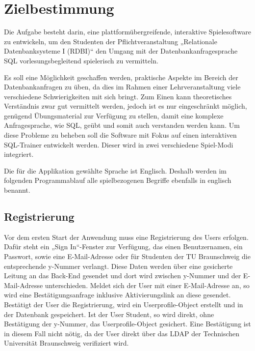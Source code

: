 
\chapter{Zielbestimmung}\label{chap:zielbestimmung}

Die Aufgabe besteht darin, eine plattform\"ubergreifende, interaktive Spielesoftware zu entwickeln, um den
Studenten der Pflichtveranstaltung „Relationale Datenbanksysteme I (RDBI)“ den Umgang mit
der Datenbankanfragesprache SQL vorlesungsbegleitend spielerisch zu vermitteln.

Es soll eine M\"oglichkeit geschaffen werden, praktische Aspekte im Bereich der Datenbankanfragen zu \"uben, da dies im Rahmen 
einer Lehrveranstaltung viele verschiedene Schwierigkeiten mit sich bringt. Zum Einen kann theoretisches Verst\"andnis zwar gut vermittelt werden, 
jedoch ist es nur eingeschr\"ankt m\"oglich, gen\"ugend \"Ubungsmaterial zur Verf\"ugung zu stellen, damit eine komplexe Anfragesprache, wie 
SQL, ge\"ubt und somit auch verstanden werden kann.
Um diese Probleme zu beheben soll die Software mit Fokus auf einen interaktiven SQL-Trainer entwickelt werden. Dieser wird
in zwei verschiedene Spiel-Modi integriert.

Die f\"ur die Applikation gew\"ahlte Sprache ist Englisch. Deshalb werden im folgenden Programmablauf alle spielbezogenen Begriffe 
ebenfalls in englisch benannt. 
 
\section{Registrierung} 
Vor dem ersten Start der Anwendung muss eine Registrierung des Users erfolgen. Daf\"ur steht ein „Sign In“-Fenster
zur Verf\"ugung, das einen Benutzernamen, ein Passwort, sowie eine E-Mail-Adresse oder f\"ur Studenten der TU Braunschweig 
die entsprechende y-Nummer verlangt. Diese Daten werden \"uber eine gesicherte Leitung an das Back-End 
gesendet und dort wird  zwischen y-Nummer und der E-Mail-Adresse unterschieden. Meldet sich der User mit einer E-Mail-Adresse an, so wird 
eine Best\"atigungsanfrage inklusive Aktivierungslink an diese gesendet. Best\"atigt der User die Registrierung, wird ein Userprofile-Object erstellt 
und in der Datenbank gespeichert. Ist der User Student, so wird direkt, ohne Best\"atigung der y-Nummer, das Userprofile-Object gesichert. Eine 
Best\"atigung ist in diesem Fall nicht n\"otig, da der User direkt \"uber das LDAP der Technischen Universit\"at Braunschweig verifiziert wird.


